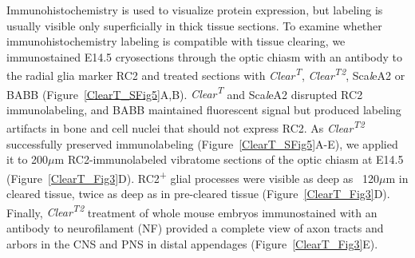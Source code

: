 Immunohistochemistry is used to visualize protein expression, but labeling is usually visible only superficially in thick tissue sections.
To examine whether immunohistochemistry labeling is compatible with tissue clearing, we immunostained E14.5 cryosections through the optic chiasm with an antibody to the radial glia marker RC2 and treated sections with \emph{Clear\textsuperscript{T}}, \emph{Clear\textsuperscript{T2}}, Sca\emph{l}eA2 or BABB (Figure~\ref{ClearT_SFig5}A,B).
\emph{Clear\textsuperscript{T}} and Sca\emph{l}eA2 disrupted RC2 immunolabeling, and BABB maintained fluorescent signal but produced labeling artifacts in bone and cell nuclei that should not express RC2.
As \emph{Clear\textsuperscript{T2}} successfully preserved immunolabeling (Figure~\ref{ClearT_SFig5}A-E), we applied it to 200$\mu$m RC2-immunolabeled vibratome sections of the optic chiasm at E14.5 (Figure~\ref{ClearT_Fig3}D).
RC2\textsuperscript{+} glial processes were visible as deep as ~120$\mu$m in cleared tissue, twice as deep as in pre-cleared tissue (Figure~\ref{ClearT_Fig3}D).
Finally, \emph{Clear\textsuperscript{T2}} treatment of whole mouse embryos immunostained with an antibody to neurofilament (NF) provided a complete view of axon tracts and arbors in the CNS and PNS in distal appendages (Figure~\ref{ClearT_Fig3}E).
